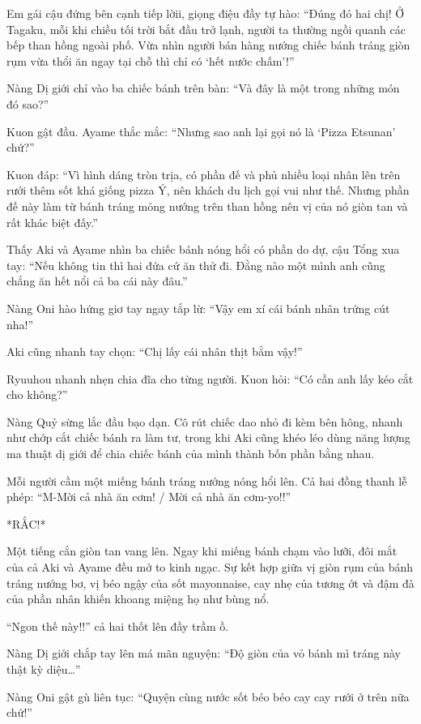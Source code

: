 \documentclass[../main.tex]{subfiles}
\begin{document}
Em gái cậu đứng bên cạnh tiếp lờii, giọng điệu đầy tự hào: ``Đúng đó hai chị! Ở Tagaku, mỗi khi chiều tối trời bắt đầu trở lạnh, người ta thường ngồi quanh các bếp than hồng ngoài phố. Vừa nhìn người bán hàng nướng chiếc bánh tráng giòn rụm vừa thổi ăn ngay tại chỗ thì chỉ có `hết nước chấm'!''

Nàng Dị giới chỉ vào ba chiếc bánh trên bàn: ``Và đây là một trong những món đó sao?''

Kuon gật đầu. Ayame thắc mắc: ``Nhưng sao anh lại gọi nó là `Pizza Etsunan' chứ?''

Kuon đáp: ``Vì hình dáng tròn trịa, có phần đế và phủ nhiều loại nhân lên trên rưới thêm sốt khá giống pizza Ý, nên khách du lịch gọi vui như thế. Nhưng phần đế này làm từ bánh tráng mỏng nướng trên than hồng nên vị của nó giòn tan và rất khác biệt đấy.''

Thấy Aki và Ayame nhìn ba chiếc bánh nóng hổi có phần do dự, cậu Tổng xua tay: ``Nếu không tin thì hai đứa cứ ăn thử đi. Đằng nào một mình anh cũng chẳng ăn hết nổi cả ba cái này đâu.''

Nàng Oni hào hứng giơ tay ngay tắp lừ: ``Vậy em xí cái bánh nhân trứng cút nha!''

Aki cũng nhanh tay chọn: ``Chị lấy cái nhân thịt bằm vậy!''

Ryuuhou nhanh nhẹn chia đĩa cho từng người. Kuon hỏi: ``Có cần anh lấy kéo cắt cho không?''

Nàng Quỷ sừng lắc đầu bạo dạn. Cô rút chiếc dao nhỏ đi kèm bên hông, nhanh như chớp cắt chiếc bánh ra làm tư, trong khi Aki cũng khéo léo dùng năng lượng ma thuật dị giới để chia chiếc bánh của mình thành bốn phần bằng nhau.

Mỗi người cầm một miếng bánh tráng nướng nóng hổi lên. Cả hai đồng thanh lễ phép: ``M-Mời cả nhà ăn cơm! / Mời cả nhà ăn cơm-yo!!''

*RẮC!*

Một tiếng cắn giòn tan vang lên. Ngay khi miếng bánh chạm vào lưỡi, đôi mắt của cả Aki và Ayame đều mở to kinh ngạc. Sự kết hợp giữa vị giòn rụm của bánh tráng nướng bơ, vị béo ngậy của sốt mayonnaise, cay nhẹ của tương ớt và đậm đà của phần nhân khiến khoang miệng họ như bùng nổ.

``Ngon thế này!!'' cả hai thốt lên đầy trầm ồ.

Nàng Dị giới chắp tay lên má mãn nguyện: ``Độ giòn của vỏ bánh mì tráng này thật kỳ diệu\dots''

Nàng Oni gật gù liên tục: ``Quyện cùng nước sốt béo béo cay cay rưới ở trên nữa chứ!''
\end{document}

